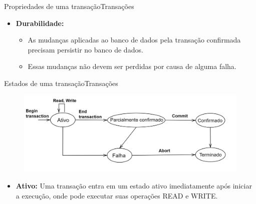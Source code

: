 \documentclass[t]{beamer}
\begin{document}

\begin{ftst}{Propriedades de uma transação}{Transações}

\begin{itemize}
    \item \textbf{Durabilidade:} 
    \vone
    \begin{itemize}
        \item As mudanças aplicadas ao banco de dados pela transação confirmada precisam persistir no banco de dados. 
        \item Essas mudanças não devem ser perdidas por causa de alguma falha.
    \end{itemize}
\end{itemize}

\end{ftst}


\begin{ftst}{Estados de uma transação}{Transações}
    \begin{figure}
        \centering
        \includegraphics[scale=0.15]{Figuras_transacoes/6.png}
    \end{figure}
    \begin{itemize}
        \item \textbf{Ativo:} Uma transação entra em um estado ativo imediatamente após iniciar a execução, onde pode executar suas operações READ e WRITE.
    \end{itemize}
    
\end{ftst}

\end{document}
